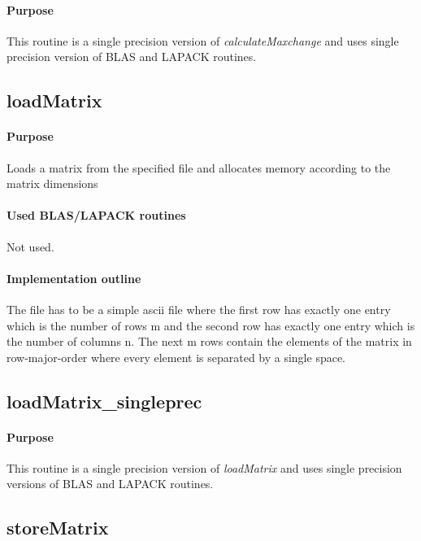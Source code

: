 \documentclass[a4paper,10pt]{scrartcl}
\begin{document}
			\paragraph{Purpose}

			This routine is a single precision version of \emph{calculateMaxchange} and uses single precision version
			of BLAS and LAPACK routines.


		\subsection{loadMatrix}

			\paragraph{Purpose}

			Loads a matrix from the specified file and allocates memory according to the matrix dimensions

			\paragraph{Used BLAS/LAPACK routines}

			Not used.

			\paragraph{Implementation outline}

			The file has to be a simple ascii file where the first row has exactly one entry which is the 
			number of rows m and the second row has exactly one entry which is the number of columns n.
 			The next m rows contain the elements of the matrix in row-major-order where every element is 
			separated by a single space.

		\subsection{loadMatrix\_singleprec}

			\paragraph{Purpose}

			This routine is a single precision version of \emph{loadMatrix} and uses single precision versions
			of BLAS and LAPACK routines.



		\subsection{storeMatrix}
\end{document}
